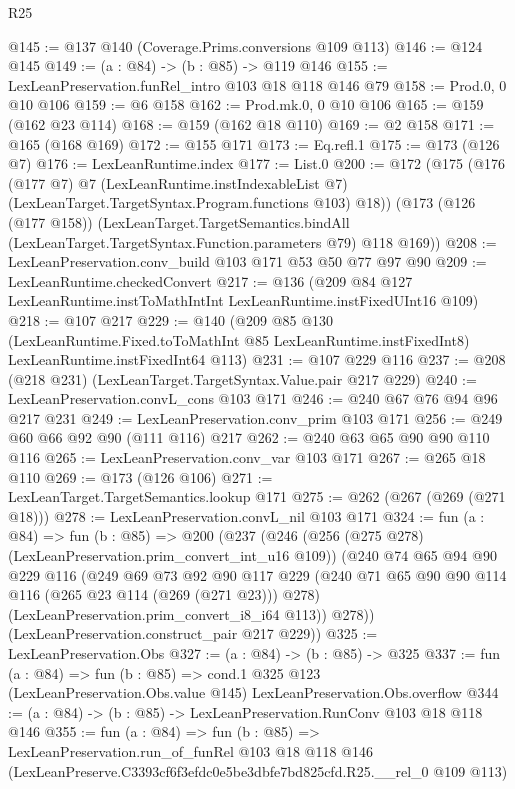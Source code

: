 \begin{lexlean}{R25}
\begin{coremodule}
@145 := @137 @140 (Coverage.Prims.conversions @109 @113)
@146 := @124 @145
@149 := (a : @84) -> (b : @85) -> @119 @146
@155 := LexLeanPreservation.funRel_intro @103 @18 @118 @146 @79
@158 := Prod.{0, 0} @10 @106
@159 := @6 @158
@162 := Prod.mk.{0, 0} @10 @106
@165 := @159 (@162 @23 @114)
@168 := @159 (@162 @18 @110)
@169 := @2 @158
@171 := @165 (@168 @169)
@172 := @155 @171
@173 := Eq.refl.{1}
@175 := @173 (@126 @7)
@176 := LexLeanRuntime.index
@177 := List.{0}
@200 := @172
    (@175
      (@176
        (@177 @7)
        @7
        (LexLeanRuntime.instIndexableList @7)
        (LexLeanTarget.TargetSyntax.Program.functions @103)
        @18))
    (@173
      (@126 (@177 @158))
      (LexLeanTarget.TargetSemantics.bindAll
        (LexLeanTarget.TargetSyntax.Function.parameters @79)
        @118
        @169))
@208 := LexLeanPreservation.conv_build @103 @171 @53 @50 @77 @97 @90
@209 := LexLeanRuntime.checkedConvert
@217 := @136 (@209 @84 @127 LexLeanRuntime.instToMathIntInt LexLeanRuntime.instFixedUInt16 @109)
@218 := @107 @217
@229 := @140
    (@209
      @85
      @130
      (LexLeanRuntime.Fixed.toToMathInt @85 LexLeanRuntime.instFixedInt8)
      LexLeanRuntime.instFixedInt64
      @113)
@231 := @107 @229 @116
@237 := @208 (@218 @231) (LexLeanTarget.TargetSyntax.Value.pair @217 @229)
@240 := LexLeanPreservation.convL_cons @103 @171
@246 := @240 @67 @76 @94 @96 @217 @231
@249 := LexLeanPreservation.conv_prim @103 @171
@256 := @249 @60 @66 @92 @90 (@111 @116) @217
@262 := @240 @63 @65 @90 @90 @110 @116
@265 := LexLeanPreservation.conv_var @103 @171
@267 := @265 @18 @110
@269 := @173 (@126 @106)
@271 := LexLeanTarget.TargetSemantics.lookup @171
@275 := @262 (@267 (@269 (@271 @18)))
@278 := LexLeanPreservation.convL_nil @103 @171
@324 := fun (a : @84) =>
  fun (b : @85) =>
  @200
    (@237
      (@246
        (@256 (@275 @278) (LexLeanPreservation.prim_convert_int_u16 @109))
        (@240
          @74
          @65
          @94
          @90
          @229
          @116
          (@249
            @69
            @73
            @92
            @90
            @117
            @229
            (@240 @71 @65 @90 @90 @114 @116 (@265 @23 @114 (@269 (@271 @23))) @278)
            (LexLeanPreservation.prim_convert_i8_i64 @113))
          @278))
      (LexLeanPreservation.construct_pair @217 @229))
@325 := LexLeanPreservation.Obs
@327 := (a : @84) -> (b : @85) -> @325
@337 := fun (a : @84) =>
  fun (b : @85) =>
  cond.{1} @325 @123 (LexLeanPreservation.Obs.value @145) LexLeanPreservation.Obs.overflow
@344 := (a : @84) -> (b : @85) -> LexLeanPreservation.RunConv @103 @18 @118 @146
@355 := fun (a : @84) =>
  fun (b : @85) =>
  LexLeanPreservation.run_of_funRel
    @103
    @18
    @118
    @146
    (LexLeanPreserve.C3393cf6f3efdc0e5be3dbfe7bd825cfd.R25.__rel_0 @109 @113)
\end{coremodule}
\end{lexlean}
